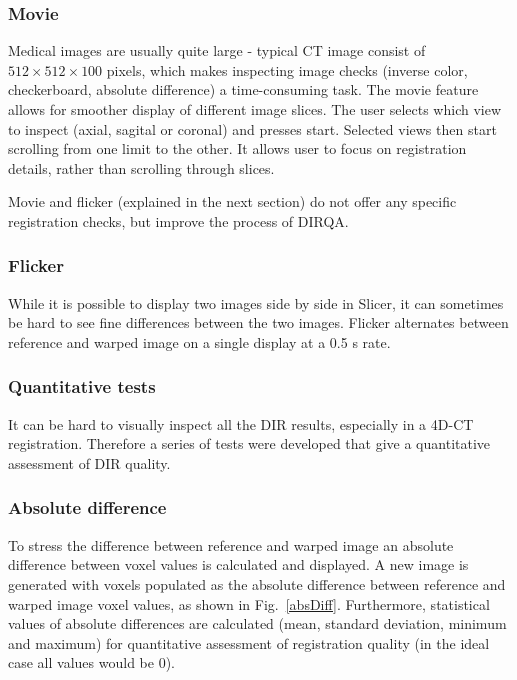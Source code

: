 \documentclass[type=dr, dr=rernat, accentcolor=tud7b,colorbacktitle, bigchapter, openright, twoside, 12pt ]{tudthesis}
\begin{document}
\subsubsection{Movie}

Medical images are usually quite large - typical CT image consist of $512 \times 512 \times 100$ pixels, which makes inspecting image checks (inverse color, checkerboard, absolute difference) a time-consuming task. The movie feature allows for smoother display of different image slices. 
The user selects which view to inspect (axial, sagital or coronal) and presses start. Selected views then start scrolling from one limit to the other. It allows user to focus on registration details, rather than scrolling through slices.

Movie and flicker (explained in the next section) do not offer any specific registration checks, but improve the process of DIRQA.

\subsubsection{Flicker}

While it is possible to display two images side by side in Slicer, it can sometimes be hard to see fine differences between the two images. Flicker alternates between reference and warped image on a single display at a 0.5 s rate.

\subsubsection{Quantitative tests}

It can be hard to visually inspect all the DIR results, especially in a 4D-CT registration. Therefore a series of tests were developed that give a quantitative assessment of DIR quality.

\subsubsection{Absolute difference}

To stress the difference between reference and warped image an absolute difference between voxel values is calculated and displayed. 
A new image is generated with voxels populated as the absolute difference between reference and warped image voxel values, as shown in Fig.~\ref{absDiff}.
Furthermore, statistical values of absolute differences are calculated (mean, standard deviation, minimum and maximum) 
for quantitative assessment of registration quality (in the ideal case all values would be 0).
\end{document}
